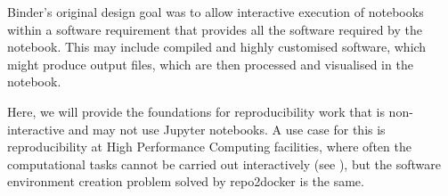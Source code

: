 \begin{task}
\begin{compactitem}
  Binder's original design goal was to allow interactive execution of notebooks within a
  software requirement that provides all the software required by the notebook.
  This may include compiled and highly customised software, which might produce
  output files, which are then processed and visualised in the notebook.

  Here, we will provide the foundations for reproducibility work that is
  non-interactive and may not use Jupyter notebooks. A use case for this is
  reproducibility at High Performance Computing facilities, where often the
  computational tasks cannot be carried out interactively (see
  ),
  but the software environment creation problem solved by repo2docker is the same.

  \end{compactitem}
\end{task}


%
%
%

